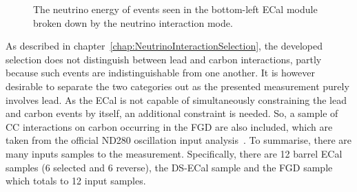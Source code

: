\begin{figure}%
  \centering
  \caption{The neutrino energy of events seen in the bottom-left ECal module broken down by the neutrino interaction mode.}
  \label{fig:NuEnergyReactionCodeBottomLeft}
\end{figure}
\newline
\newline
As described in chapter~\ref{chap:NeutrinoInteractionSelection}, the developed selection does not distinguish between lead and carbon interactions, partly because such events are indistinguishable from one another.  It is however desirable to separate the two categories out as the presented measurement purely involves lead.  As the ECal is not capable of simultaneously constraining the lead and carbon events by itself, an additional constraint is needed.  So, a sample of CC interactions on carbon occurring in the FGD are also included, which are taken from the official ND280 oscillation input analysis~\cite{CCIncSelFGDTN}.
\newline
\newline
To summarise, there are many inputs samples to the measurement.  Specifically, there are 12 barrel ECal samples (6 selected and 6 reverse), the DS-ECal sample and the FGD sample which totals to 12 input samples.

